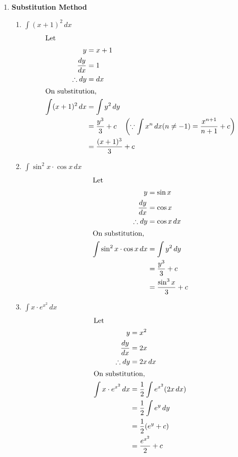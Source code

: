 \begin{enumerate}
    \item \textbf{Substitution Method}
    \begin{enumerate}
        \item $\int (x + 1)^2 \, dx$
            \begin{align*}
                \intertext{Let } 
                y &= x + 1 \\
                \frac{dy}{dx} &= 1\\
                \therefore dy &= dx \\
                \intertext{On substitution,}
                \int (x + 1)^2 \, dx &= \int y^2 \, dy \\
                &= \frac{y^3}{3} + c \quad \left( \because \int x^n \, dx (n \ne -1) = \frac{x^{n+1}}{n+1} + c \right) \\
                &= \frac{(x + 1)^3}{3} + c
            \end{align*}

        \item $\int \sin^2 x \cdot \cos x \, dx$
            \begin{align*}
                \intertext{Let } 
                y &= \sin x \\
                \frac{dy}{dx} &= \cos x \\
                \therefore dy &= \cos x \, dx \\
                \intertext{On substitution,}
                \int \sin^2 x \cdot \cos x \, dx &= \int y^2 \, dy \\
                &= \frac{y^3}{3} + c \\
                &= \frac{\sin^3 x}{3} + c
            \end{align*}

        \item $\int x \cdot e^{x^2} \, dx$
            \begin{align*}
                \intertext{Let } 
                y &= x^2 \\
                \frac{dy}{dx} &= 2x \\
                \therefore dy &= 2x \, dx \\
                \intertext{On substitution,}
                \int x \cdot e^{x^2} \, dx &= \frac{1}{2} \int e^{x^2} (2x \, dx) \\
                &= \frac{1}{2} \int e^y \, dy \\
                &= \frac{1}{2} (e^y + c) \\
                &= \frac{e^{x^2}}{2} + c
            \end{align*}
    \end{enumerate}


\end{enumerate}

